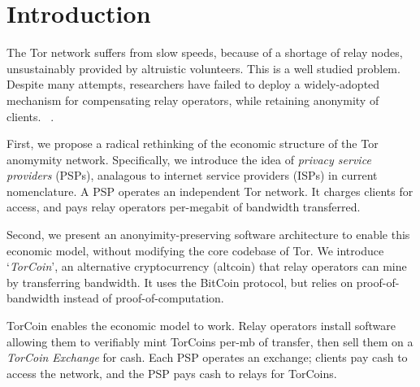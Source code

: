 \section{Introduction}

The Tor network suffers from slow speeds, because of a shortage of relay nodes, unsustainably provided by 
altruistic volunteers. This is a well studied problem. Despite many attempts, researchers have failed to deploy a widely-adopted mechanism for compensating relay operators, while retaining anonymity of clients. ~\cite{raykova-pet2008, wpes09-xpay, incentives-fc10,
ccs10-braids, acsac11-tortoise, jansen2013lira, johnson2013onions}.

First, we propose a radical rethinking of the economic structure of the Tor anomymity network. Specifically, we introduce the idea of \textit{privacy service providers} (PSPs), analagous to internet service providers (ISPs) in current nomenclature. A PSP operates an independent Tor network. It charges clients for access, and pays relay operators per-megabit of bandwidth transferred.

Second, we present an anonyimity-preserving software architecture to enable this economic model, without modifying the core codebase of Tor. We introduce `\textit{TorCoin}', an alternative cryptocurrency (altcoin) that relay operators can mine by transferring bandwidth. It uses the BitCoin protocol, but relies on proof-of-bandwidth instead of proof-of-computation.

TorCoin enables the economic model to work. Relay operators install software allowing them to verifiably mint TorCoins per-mb of transfer, then sell them on a \textit{TorCoin Exchange} for cash. Each PSP operates an exchange; clients pay cash to access the network, and the PSP pays cash to relays for TorCoins.